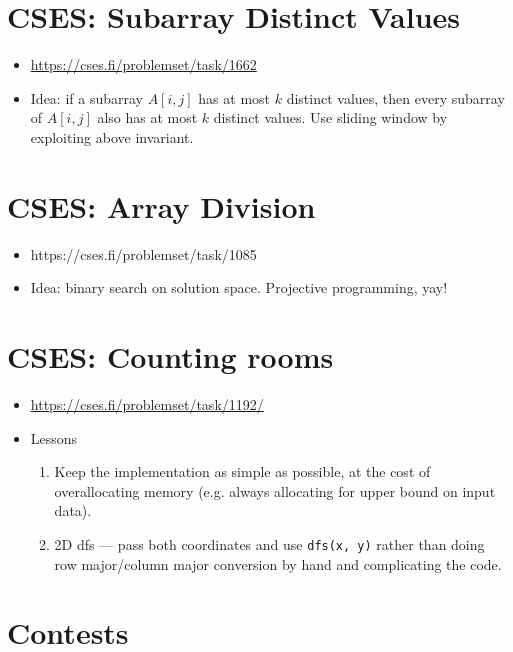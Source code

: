 \documentclass[titlepage, 12pt]{book}
\begin{document}
\section{CSES: Subarray Distinct Values}
\begin{itemize}
    \item\url{https://cses.fi/problemset/task/1662}
    \item Idea: if a subarray $A[i,j]$ has at most $k$ distinct values, then
        every subarray of $A[i, j]$ also has at most $k$ distinct values. Use
        sliding window by exploiting above invariant.
\end{itemize}
\section{CSES: Array Division}
\begin{itemize}
    \item https://cses.fi/problemset/task/1085
    \item Idea: binary search on solution space. Projective programming, yay!
\end{itemize}

\section{CSES: Counting rooms}
\begin{itemize}
  \item\url{https://cses.fi/problemset/task/1192/}
  \item Lessons
    \begin{enumerate}
      \item Keep the implementation as simple as possible, at the cost of
        overallocating memory (e.g. always allocating for upper bound on input
        data).
      \item 2D dfs --- pass both coordinates and use \verb|dfs(x, y)| rather
        than doing row major/column major conversion by hand and complicating the
        code.
    \end{enumerate}
\end{itemize}
\section{Contests}
\end{document}

